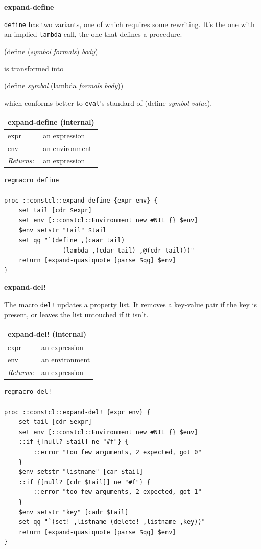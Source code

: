 \documentclass[twoside,9pt]{report}
\begin{document}
\textbf{expand-define}


\texttt{define} has two variants, one of which requires some rewriting. It's the one with an implied \texttt{lambda} call, the one that defines a procedure.


(define (\emph{symbol} \emph{formals}) \emph{body})


is transformed into


(define \emph{symbol} (lambda \emph{formals} \emph{body}))


which conforms better to \texttt{eval}'s standard of (define \emph{symbol} \emph{value}).

\begin{tabular}{ |l l| }
\hline
\multicolumn{2}{|l|}{expand-define (internal)} \\
\hline
expr & an expression \\
env & an environment \\
\textit{Returns:} & an expression \\
\hline
\end{tabular}

\noindent\makebox[\linewidth]{\rule{\linewidth}{0.4pt}}
\begin{lstlisting}
regmacro define
 
proc ::constcl::expand-define {expr env} {
    set tail [cdr $expr]
    set env [::constcl::Environment new #NIL {} $env]
    $env setstr "tail" $tail
    set qq "`(define ,(caar tail)
                (lambda ,(cdar tail) ,@(cdr tail)))"
    return [expand-quasiquote [parse $qq] $env]
}
\end{lstlisting}
\noindent\makebox[\linewidth]{\rule{\linewidth}{0.4pt}}

\textbf{expand-del!}


The macro \texttt{del!} updates a property list. It removes a key-value pair if the key is present, or leaves the list untouched if it isn't.

\begin{tabular}{ |l l| }
\hline
\multicolumn{2}{|l|}{expand-del! (internal)} \\
\hline
expr & an expression \\
env & an environment \\
\textit{Returns:} & an expression \\
\hline
\end{tabular}

\noindent\makebox[\linewidth]{\rule{\linewidth}{0.4pt}}
\begin{lstlisting}
regmacro del!
 
proc ::constcl::expand-del! {expr env} {
    set tail [cdr $expr]
    set env [::constcl::Environment new #NIL {} $env]
    ::if {[null? $tail] ne "#f"} {
        ::error "too few arguments, 2 expected, got 0"
    }
    $env setstr "listname" [car $tail]
    ::if {[null? [cdr $tail]] ne "#f"} {
        ::error "too few arguments, 2 expected, got 1"
    }
    $env setstr "key" [cadr $tail]
    set qq "`(set! ,listname (delete! ,listname ,key))"
    return [expand-quasiquote [parse $qq] $env]
}
\end{lstlisting}
\noindent\makebox[\linewidth]{\rule{\linewidth}{0.4pt}}
\end{document}

